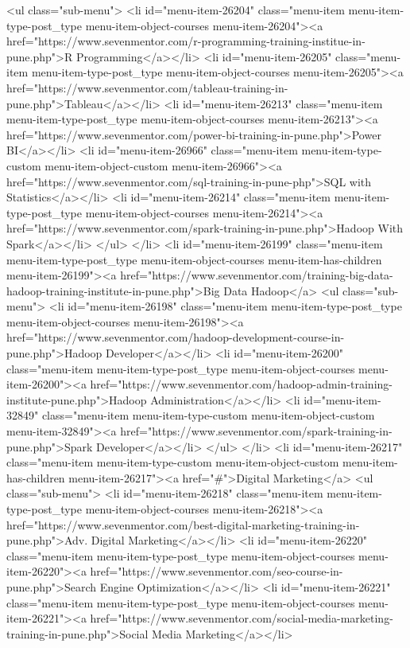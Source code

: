 {<ul class="sub-menu">
<li id="menu-item-26204" class="menu-item menu-item-type-post_type menu-item-object-courses menu-item-26204"><a href="https://www.sevenmentor.com/r-programming-training-institue-in-pune.php">R Programming</a></li>
<li id="menu-item-26205" class="menu-item menu-item-type-post_type menu-item-object-courses menu-item-26205"><a href="https://www.sevenmentor.com/tableau-training-in-pune.php">Tableau</a></li>
<li id="menu-item-26213" class="menu-item menu-item-type-post_type menu-item-object-courses menu-item-26213"><a href="https://www.sevenmentor.com/power-bi-training-in-pune.php">Power BI</a></li>
<li id="menu-item-26966" class="menu-item menu-item-type-custom menu-item-object-custom menu-item-26966"><a href="https://www.sevenmentor.com/sql-training-in-pune-php">SQL with Statistics</a></li>
<li id="menu-item-26214" class="menu-item menu-item-type-post_type menu-item-object-courses menu-item-26214"><a href="https://www.sevenmentor.com/spark-training-in-pune.php">Hadoop With Spark</a></li>
</ul>
</li>
<li id="menu-item-26199" class="menu-item menu-item-type-post_type menu-item-object-courses menu-item-has-children menu-item-26199"><a href="https://www.sevenmentor.com/training-big-data-hadoop-training-institute-in-pune.php">Big Data Hadoop</a>
<ul class="sub-menu">
<li id="menu-item-26198" class="menu-item menu-item-type-post_type menu-item-object-courses menu-item-26198"><a href="https://www.sevenmentor.com/hadoop-development-course-in-pune.php">Hadoop Developer</a></li>
<li id="menu-item-26200" class="menu-item menu-item-type-post_type menu-item-object-courses menu-item-26200"><a href="https://www.sevenmentor.com/hadoop-admin-training-institute-pune.php">Hadoop Administration</a></li>
<li id="menu-item-32849" class="menu-item menu-item-type-custom menu-item-object-custom menu-item-32849"><a href="https://www.sevenmentor.com/spark-training-in-pune.php">Spark Developer</a></li>
</ul>
</li>
<li id="menu-item-26217" class="menu-item menu-item-type-custom menu-item-object-custom menu-item-has-children menu-item-26217"><a href="#">Digital Marketing</a>
<ul class="sub-menu">
<li id="menu-item-26218" class="menu-item menu-item-type-post_type menu-item-object-courses menu-item-26218"><a href="https://www.sevenmentor.com/best-digital-marketing-training-in-pune.php">Adv. Digital Marketing</a></li>
<li id="menu-item-26220" class="menu-item menu-item-type-post_type menu-item-object-courses menu-item-26220"><a href="https://www.sevenmentor.com/seo-course-in-pune.php">Search Engine Optimization</a></li>
<li id="menu-item-26221" class="menu-item menu-item-type-post_type menu-item-object-courses menu-item-26221"><a href="https://www.sevenmentor.com/social-media-marketing-training-in-pune.php">Social Media Marketing</a></li>
}
